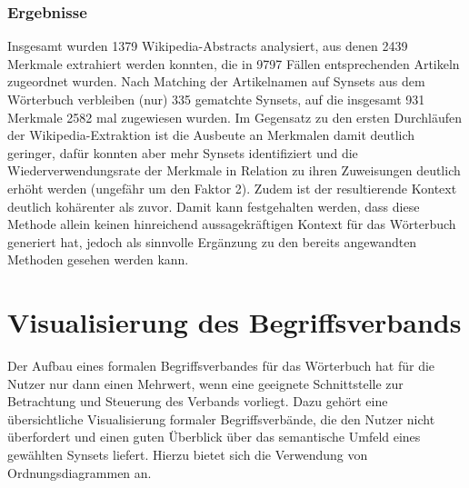 \documentclass[pagesize,paper=A4,DIV=calc,fontsize=12pt,draft=false]{scrreprt}
\begin{document}
\subsubsection{Ergebnisse}
\label{subsubsec:results}

Insgesamt wurden 1379 Wikipedia-Abstracts analysiert, aus denen 2439 Merkmale extrahiert werden konnten, die in 9797 Fällen entsprechenden Artikeln zugeordnet wurden. 
Nach Matching der Artikelnamen auf Synsets aus dem Wörterbuch verbleiben (nur) 335 gematchte Synsets, auf die insgesamt 931 Merkmale 2582 mal zugewiesen wurden. 
Im Gegensatz zu den ersten Durchläufen der Wikipedia-Extraktion ist die Ausbeute an Merkmalen damit deutlich geringer, dafür konnten aber mehr Synsets identifiziert und die Wiederverwendungsrate der Merkmale in Relation zu ihren Zuweisungen deutlich erhöht werden (ungefähr um den Faktor 2). 
Zudem ist der resultierende Kontext deutlich kohärenter als zuvor. 
Damit kann festgehalten werden, dass diese Methode allein keinen hinreichend aussagekräftigen Kontext für das Wörterbuch generiert hat, jedoch als sinnvolle Ergänzung zu den bereits angewandten Methoden gesehen werden kann. 

\section{Visualisierung des Begriffsverbands}
\label{sec:visualization_0}

Der Aufbau eines formalen Begriffsverbandes für das Wörterbuch hat für die Nutzer nur dann einen Mehrwert, wenn eine geeignete Schnittstelle zur Betrachtung und Steuerung des Verbands vorliegt. 
Dazu gehört eine übersichtliche Visualisierung formaler Begriffsverbände, die den Nutzer nicht überfordert und einen guten Überblick über das semantische Umfeld eines gewählten Synsets liefert.
Hierzu bietet sich die Verwendung von Ordnungsdiagrammen an. 
\end{document}
